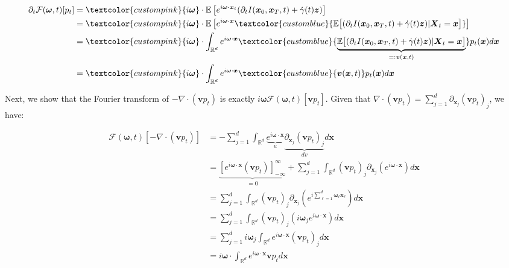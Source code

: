 \documentclass{article}
\newcommand{\bluetext}[1]{\textcolor{customblue}{#1}}
\newcommand{\pinktext}[1]{\textcolor{custompink}{#1}}
\begin{document}
\begin{small}
\begin{align}
    \partial_t\mathcal{F}(\boldsymbol{\omega},t)[p_t]&=\pinktext{i\boldsymbol{\omega}}\cdot\mathbb{E}\left[e^{i\boldsymbol{\omega}\cdot \boldsymbol{x}_t}(\partial_tI(\boldsymbol{x}_0, \boldsymbol{x}_T,t)+\dot{\gamma}(t)\boldsymbol{z})\right]\nonumber\\
    &=\pinktext{i\boldsymbol{\omega}}\cdot\mathbb{E}\left[e^{i\boldsymbol{\omega}\cdot \boldsymbol{x}}\bluetext{\mathbb{E}\big[(\partial_tI(\boldsymbol{x}_0, \boldsymbol{x}_T,t)+\dot{\gamma}(t)\boldsymbol{z})|\boldsymbol{X}_t=\boldsymbol{x}\big]}\right]\nonumber\\
    &=\pinktext{i\boldsymbol{\omega}}\cdot\int_{\mathbb{R}^d} e^{i\boldsymbol{\omega}\cdot \boldsymbol{x}}\bluetext{\underbrace{\mathbb{E}\big[(\partial_tI(\boldsymbol{x}_0, \boldsymbol{x}_T,t)+\dot{\gamma}(t)\boldsymbol{z})|\boldsymbol{X}_t=\boldsymbol{x}\big]}_{=:\boldsymbol{v}(\boldsymbol{x},t)}}p_t(\boldsymbol{x})d\boldsymbol{x}\nonumber\\
    &=\pinktext{i\boldsymbol{\omega}}\cdot\int_{\mathbb{R}^d} e^{i\boldsymbol{\omega}\cdot \boldsymbol{x}}\bluetext{\boldsymbol{v}(\boldsymbol{x},t)}p_t(\boldsymbol{x})d\boldsymbol{x}
\end{align}
\end{small}
Next, we show that the Fourier transform of $-\nabla \cdot (\boldsymbol{v}p_t)$ is exactly $i\boldsymbol{\omega}\mathcal{F}(\boldsymbol{\omega},t)[\boldsymbol{v}p_t]$. Given that $\nabla\cdot (\boldsymbol{v}p_t)=\sum_{j=1}^d\partial_{\boldsymbol{x}_j}(\boldsymbol{v}p_t)_j$, we have:
\begin{small}
\begin{align}
    \mathcal{F}(\boldsymbol{\omega},t)[-\nabla \cdot (\boldsymbol{v}p_t)]&=-\sum_{j=1}^d\int_{\mathbb{R}^d}\underbrace{e^{i\boldsymbol{\omega}\cdot\boldsymbol{x}}}_{u}\underbrace{\partial_{\boldsymbol{x}_j}(\boldsymbol{v}p_t)_j}_{dv}d\boldsymbol{x}\nonumber\\
    &=\underbrace{\left[e^{i\boldsymbol{\omega}\cdot\boldsymbol{x}}(\boldsymbol{v}p_t)\right]_{-\infty}^\infty}_{=0}+\sum_{j=1}^d\int_{\mathbb{R}^d}(\boldsymbol{v}p_t)_j\partial_{\boldsymbol{x}_j}\left(e^{i\boldsymbol{\omega}\cdot \boldsymbol{x}}\right)d\boldsymbol{x}\nonumber\\
    &=\sum_{j=1}^d\int_{\mathbb{R}^d}(\boldsymbol{v}p_t)_j\partial_{\boldsymbol{x}_j}\left(e^{i\sum_{\ell=1}^d\boldsymbol{\omega}_\ell \boldsymbol{x}_\ell}\right)d\boldsymbol{x}\nonumber\\
    &=\sum_{j=1}^d\int_{\mathbb{R}^d}(\boldsymbol{v}p_t)_j\left(i\boldsymbol{\omega}_je^{i\boldsymbol{\omega}\cdot\boldsymbol{x}}\right)d\boldsymbol{x}\nonumber\\
    &=\sum_{j=1}^di\boldsymbol{\omega}_j\int_{\mathbb{R}^d}e^{i\boldsymbol{\omega}\cdot\boldsymbol{x}}(\boldsymbol{v}p_t)_jd\boldsymbol{x}\nonumber\\
    &=i\boldsymbol{\omega}\cdot \int_{\mathbb{R}^d}e^{i\boldsymbol{\omega}\cdot\boldsymbol{x}}\boldsymbol{v}p_td\boldsymbol{x}
\end{align}
\end{small}
\end{document}
